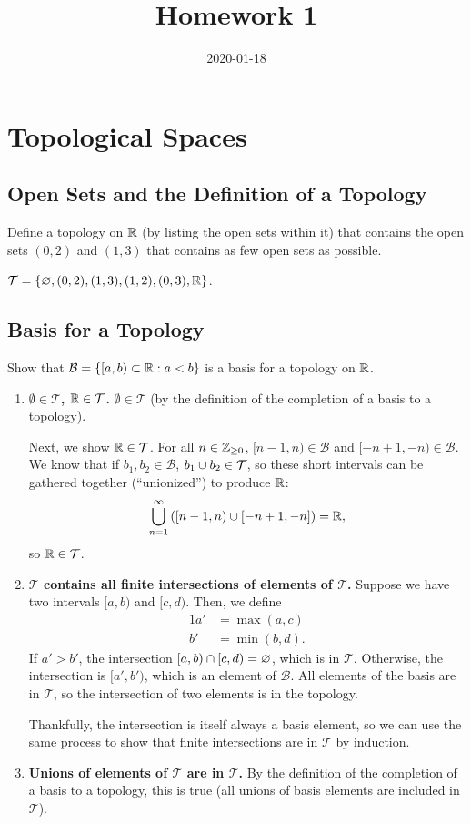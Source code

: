 \documentclass[twocolumn, noxcolor, maketitle]{mathnotes-hw}
\title{Homework 1}
\date{2020-01-18}
\def\T{\mathcal{T}}
\def\basis{\mathcal{B}}
\begin{document}
\maketitle

\section{Topological Spaces}
\subsection{Open Sets and the Definition of a Topology}
\begin{problem}[1.7]
  Define a topology on $\mathbb{R}$ (by listing the open sets within it) that contains
  the open sets $(0,2)$ and $(1,3)$ that contains as few open sets as possible.
\end{problem}
$\T = \{ \emptyset, (0,2), (1,3), (1,2), (0,3), \R \}$.

\subsection{Basis for a Topology}
\begin{problem}[1.10]
  Show that $\mathcal{B} = \{[a,b) \subset \mathbb{R} : a < b\}$ is a basis for a
  topology on $\mathbb{R}$.
\end{problem}
\begin{enumerate}
  \item \textbf{$\emptyset \in \T$, $\R \in \T$.} $\emptyset \in \T$ (by the
    definition of the completion of a basis to a topology).

    Next, we show $\R \in \T$. For all $n \in \mathbb{Z}_{\ge 0}$, $[n-1, n) \in \basis$
    and $[-n + 1, -n) \in \basis$. We know that if $b_1, b_2 \in \basis$, $b_1
    \union b_2 \in \T$, so these short intervals can be gathered together (``unionized'')
    to produce $\mathbb{R}$:
    \[ \bigcup_{n=1}^{\infty} \left( [n-1, n) \cup [-n + 1, -n] \right) = \mathbb{R}, \]
    so $\R \in \T$.

  \item \textbf{$\T$ contains all finite intersections of elements of $\T$.}
    Suppose we have two intervals $[a, b)$ and $[c, d)$. Then, we define
    \begin{alignat*}{1}
      a' &= \max(a, c) \\
      b' &= \min(b, d).
    \end{alignat*}
    If $a' > b'$, the intersection $[a, b) \cap [c, d) = \varnothing$, which is
    in $\T$. Otherwise, the intersection is $[a', b')$, which is an element of
    $\basis$. All elements of the basis are in $\T$, so the intersection of two
    elements is in the topology.

    Thankfully, the intersection is itself always a basis element, so we can
    use the same process to show that finite intersections are in $\T$ by
    induction.

  \item \textbf{Unions of elements of $\T$ are in $\T$.} By the definition of
    the completion of a basis to a topology, this is true (all unions of basis
    elements are included in $\T$).
\end{enumerate}
\end{document}
